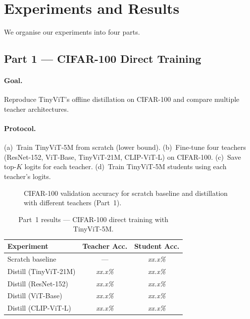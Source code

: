 \documentclass[10pt,twocolumn]{article}
\begin{document}
\section{Experiments and Results}
\label{sec:results}

We organise our experiments into four parts.

\subsection{Part 1 --- CIFAR-100 Direct Training}

\paragraph{Goal.} Reproduce TinyViT's offline distillation on CIFAR-100 and
compare multiple teacher architectures.

\paragraph{Protocol.}
(a)~Train TinyViT-5M from scratch (lower bound).
(b)~Fine-tune four teachers (ResNet-152, ViT-Base, TinyViT-21M, CLIP-ViT-L)
on CIFAR-100.
(c)~Save top-$K$ logits for each teacher.
(d)~Train TinyViT-5M students using each teacher's logits.

\begin{figure}[t]
  \centering
  \caption{CIFAR-100 validation accuracy for scratch baseline and
           distillation with different teachers (Part~1).}
  \label{fig:part1}
\end{figure}

\begin{table}[t]
\centering
\caption{Part~1 results --- CIFAR-100 direct training with TinyViT-5M.}
\label{tab:part1}
\small
\begin{tabular}{@{}lcc@{}}
\toprule
Experiment & Teacher Acc. & Student Acc. \\
\midrule
Scratch baseline       & ---    & \textit{xx.x\%} \\
\midrule
Distill (TinyViT-21M) & \textit{xx.x\%} & \textit{xx.x\%} \\
Distill (ResNet-152)   & \textit{xx.x\%} & \textit{xx.x\%} \\
Distill (ViT-Base)     & \textit{xx.x\%} & \textit{xx.x\%} \\
Distill (CLIP-ViT-L)  & \textit{xx.x\%} & \textit{xx.x\%} \\
\bottomrule
\end{tabular}
\end{table}
\end{document}
